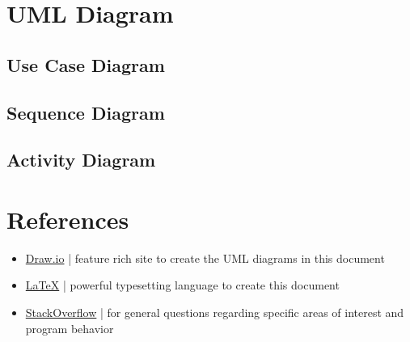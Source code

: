 \documentclass[12pt]{article}
\begin{document}
\section{UML Diagram}

\subsection{Use Case Diagram}

\subsection{Sequence Diagram}

\subsection{Activity Diagram}

\section{References}

\begin{itemize}
\item \href{https://app.diagrams.net/}{Draw.io} | feature rich site to create the UML diagrams in this document
\item \href{https://www.latex-project.org/}{\LaTeX} | powerful typesetting language to create this document
\item \href{https://stackoverflow.com/}{StackOverflow} | for general questions regarding specific areas of interest and program behavior
\end{itemize}
\end{document}
